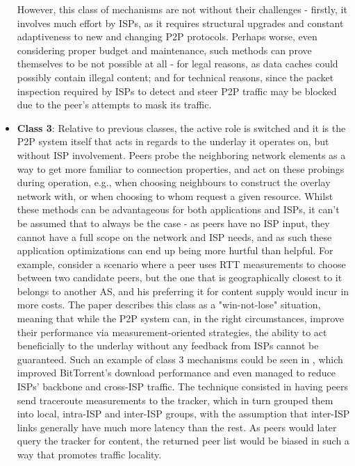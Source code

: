 \begin{itemize}
            However, this class of mechanisms are not without their challenges - firstly, it involves much effort by ISPs, as it requires structural upgrades and constant adaptiveness to new and changing P2P protocols.
            Perhaps worse, even considering proper budget and maintenance, such methods can prove themselves to be not possible at all - for legal reasons, as data caches could possibly contain illegal content; and for technical reasons, since the packet inspection required by ISPs to detect and steer P2P traffic may be blocked due to the peer's attempts to mask its traffic.
        \item \textbf{Class 3}:
            Relative to previous classes, the active role is switched and it is the P2P system itself that acts in regards to the underlay it operates on, but without ISP involvement.
            Peers probe the neighboring network elements as a way to get more familiar to connection properties, and act on these probings during operation, e.g., when choosing neighbours to construct the overlay network with, or when choosing to whom request a given resource.
            Whilst these methods can be advantageous for both applications and ISPs, it can't be assumed that to always be the case - as peers have no ISP input, they cannot have a full scope on the network and ISP needs, and as such these application optimizations can end up being more hurtful than helpful.
            For example, consider a scenario where a peer uses RTT measurements to choose between two candidate peers, but the one that is geographically closest to it belongs to another AS, and his preferring it for content supply would incur in more costs.
            The paper describes this class as a "win-not-lose" situation, meaning that while the P2P system can, in the right circumstances, improve their performance via measurement-oriented strategies, the ability to act beneficially to the underlay without any feedback from ISPs cannot be guaranteed.
            Such an example of class 3 mechanisms could be seen in \cite{qin2009}, which improved BitTorrent's download performance and even managed to reduce ISPs' backbone and cross-ISP traffic.
            The technique consisted in having peers send traceroute measurements to the tracker, which in turn grouped them into local, intra-ISP and inter-ISP groups, with the assumption that inter-ISP links generally have much more latency than the rest.
            As peers would later query the tracker for content, the returned peer list would be biased in such a way that promotes traffic locality.

\end{itemize}
